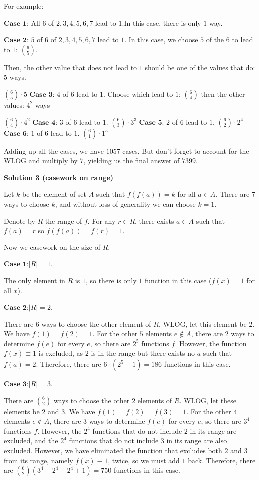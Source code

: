 \begin{enumerate}
 
For example:

 
$\textbf{Case 1:}$ All $6$ of $2, 3, 4, 5, 6, 7$ lead to $1$.In this case, there is only $1$ way.

 $\textbf{Case 2:}$ $5$ of $6$ of $2, 3, 4, 5, 6, 7$ lead to $1$. In this case, we choose $5$ of the $6$ to lead to $1$: $6\choose5$.

 Then, the other value that does not lead to $1$ should be one of the values that do: $5$ ways.

 $\binom{6}{5}\cdot5$
$\textbf{Case 3:}$ $4$ of $6$ lead to $1$. Choose which lead to $1$: $6\choose4$ then the other values: $4^2$ ways

 $\binom{6}{4}\cdot4^2$
$\textbf{Case 4:}$ $3$ of $6$ lead to $1$. $\binom{6}{3}\cdot3^3$
$\textbf{Case 5:}$ $2$ of $6$ lead to $1$. $\binom{6}{2}\cdot2^4$
$\textbf{Case 6:}$ $1$ of $6$ lead to $1$. $\binom{6}{1}\cdot1^5$

 
Adding up all the cases, we have $1057$ cases. But don't forget to account for the WLOG and multiply by $7$, yielding us the final answer of $7\boxed{399}.$




\textbf{Solution 3 (casework on range)}

Let $k$ be the element of set $A$ such that $f(f(a))=k$ for all $a \in A$. There are $7$ ways to choose $k$, and without loss of generality we can choose $k=1$.

 Denote by $R$ the range of $f$. For any $r \in R$, there exists $a \in A$ such that $f(a)=r$ so $f(f(a))=f(r)=1$. 

 Now we casework on the size of $R$.

 $\textbf{Case 1:} |R|=1$.

 The only element in $R$ is $1$, so there is only $1$ function in this case ($f(x)=1$ for all $x$).

 $\textbf{Case 2:} |R|=2$.

 There are $6$ ways to choose the other element of $R$. WLOG, let this element be $2$. We have $f(1)=f(2)=1$. For the other $5$ elements $e \notin A$, there are $2$ ways to determine $f(e)$ for every $e$, so there are $2^5$ functions $f$. However, the function $f(x) \equiv 1$ is excluded, as $2$ is in the range but there exists no $a$ such that $f(a)=2$. Therefore, there are $6 \cdot (2^5-1)=186$ functions in this case.

 $\textbf{Case 3:} |R|=3$.

 There are $\binom{6}{2}$ ways to choose the other $2$ elements of $R$. WLOG, let these elements be $2$ and $3$. We have $f(1)=f(2)=f(3)=1$. For the other $4$ elements $e \notin A$, there are $3$ ways to determine $f(e)$ for every $e$, so there are $3^4$ functions $f$. However, the $2^4$ functions that do not include $2$ in its range are excluded, and the $2^4$ functions that do not include $3$ in its range are also excluded. However, we have eliminated the function that excludes both $2$ and $3$ from its range, namely $f(x) \equiv 1$, twice, so we must add $1$ back. Therefore, there are $\binom{6}{2}(3^4-2^4-2^4+1)=750$ functions in this case.


\end{enumerate}
